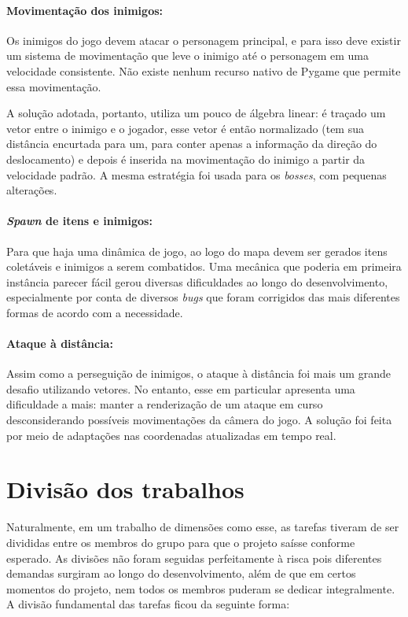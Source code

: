 \documentclass[a4paper,12pt]{article}
\begin{document}
\paragraph{Movimentação dos inimigos:} Os inimigos do jogo devem atacar o personagem principal, e para isso deve existir um sistema de movimentação que leve o inimigo até o personagem em uma velocidade consistente. Não existe nenhum recurso nativo de Pygame que permite essa movimentação. 

A solução adotada, portanto, utiliza um pouco de álgebra linear: é traçado um vetor entre o inimigo e o jogador, esse vetor é então normalizado (tem sua distância encurtada para um, para conter apenas a informação da direção do deslocamento) e depois é inserida na movimentação do inimigo a partir da velocidade padrão. A mesma estratégia foi usada para os \textit{bosses}, com pequenas alterações.

\paragraph{\textit{Spawn} de itens e inimigos:} Para que haja uma dinâmica de jogo, ao logo do mapa devem ser gerados itens coletáveis e inimigos a serem combatidos. Uma mecânica que poderia em primeira instância parecer fácil gerou diversas dificuldades ao longo do desenvolvimento, especialmente por conta de diversos \textit{bugs} que foram corrigidos das mais diferentes formas de acordo com a necessidade.

\paragraph{Ataque à distância:} Assim como a perseguição de inimigos, o ataque à distância foi mais um grande desafio utilizando vetores. No entanto, esse em particular apresenta uma dificuldade a mais: manter a renderização de um ataque em curso desconsiderando possíveis movimentações da câmera do jogo. A solução foi feita por meio de adaptações nas coordenadas atualizadas em tempo real. 

\section{Divisão dos trabalhos}

Naturalmente, em um trabalho de dimensões como esse, as tarefas tiveram de ser divididas entre os membros do grupo para que o projeto saísse conforme esperado. As divisões não foram seguidas perfeitamente à risca pois diferentes demandas surgiram ao longo do desenvolvimento, além de que em certos momentos do projeto, nem todos os membros puderam se dedicar integralmente. A divisão fundamental das tarefas ficou da seguinte forma:
\end{document}

